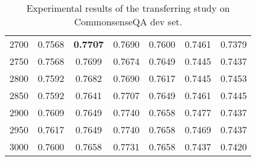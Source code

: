 \documentclass[11pt,a4paper]{article}
\begin{document}
\begin{table*}[th!]
{\begin{tabular}{c|cccccc@{}}
2700           & 0.7568  & \textbf{0.7707}    & 0.7690   & 0.7600      & 0.7461         & 0.7379            \\
2750           & 0.7568  & 0.7699     & 0.7674   & 0.7649      & 0.7445         & 0.7437            \\
2800           & 0.7592  & 0.7682     & 0.7690   & 0.7617      & 0.7445         & 0.7453            \\
2850           & 0.7592  & 0.7641     & 0.7707   & 0.7649      & 0.7461         & 0.7445            \\
2900           & 0.7609  & 0.7649     & 0.7740   & 0.7658      & 0.7477         & 0.7437            \\
2950           & 0.7617  & 0.7649     & 0.7740   & 0.7658      & 0.7469         & 0.7437            \\
3000           & 0.7600  & 0.7658     & 0.7731   & 0.7658      & 0.7437         & 0.7420     \\   
\bottomrule
\end{tabular}
		
	} 
	\caption{Experimental results of the transferring study on CommonsenseQA dev set.}
	\label{tab:detailtransfer}
\end{table*}

 
	
\end{document}
